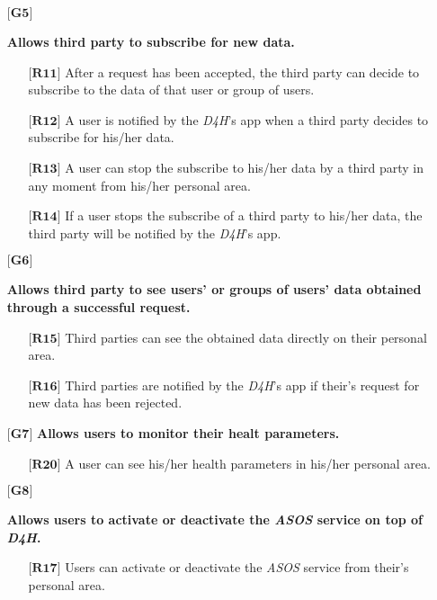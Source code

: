 \begin{itemize}
	\item[${\textbf{[G5]}}$] {\textbf{Allows third party to subscribe for new data.}
		\begin{itemize}
			\item[$\textbf{[R11]}$] {After a request has been accepted, the third party can decide to subscribe to the data of that user or group of users.}
			\item[$\textbf{[R12]}$] {A user is notified by the \hbox{\emph{D4H}}'s app when a third party decides to subscribe for his/her data.}
			\item[$\textbf{[R13]}$] {A user can stop the subscribe to his/her data by a third party in any moment from his/her personal area.}
			\item[$\textbf{[R14]}$] {If a user stops the subscribe of a third party to his/her data, the third party will be notified by the \hbox{\emph{D4H}}'s app.}
		\end{itemize}}


	\item[${\textbf{[G6]}}$] {\textbf{Allows third party to see users' or groups of users' data obtained through a successful request.}
		\begin{itemize}
			\item[$\textbf{[R15]}$] {Third parties can see the obtained data directly on their personal area.}
			\item[$\textbf{[R16]}$] {Third parties are notified by the \hbox{\emph{D4H}}'s app if their's request for new data has been rejected.}
		\end{itemize}}

	\item[${\textbf{[G7]}}$] {\textbf{Allows users to monitor their healt parameters.}}
		\begin{itemize}
			\item[$\textbf{[R20]}$] {A user can see his/her health parameters in his/her personal area.}
		\end{itemize}

	\item[${\textbf{[G8]}}$] {\textbf{Allows users to activate or deactivate the \hbox{\emph{ASOS}} service on top of \hbox{\emph{D4H}}.}
		\begin{itemize}
			\item[$\textbf{[R17]}$] {Users can activate or deactivate the \hbox{\emph{ASOS}} service from their's personal area.}
		\end{itemize}}



\end{itemize}
